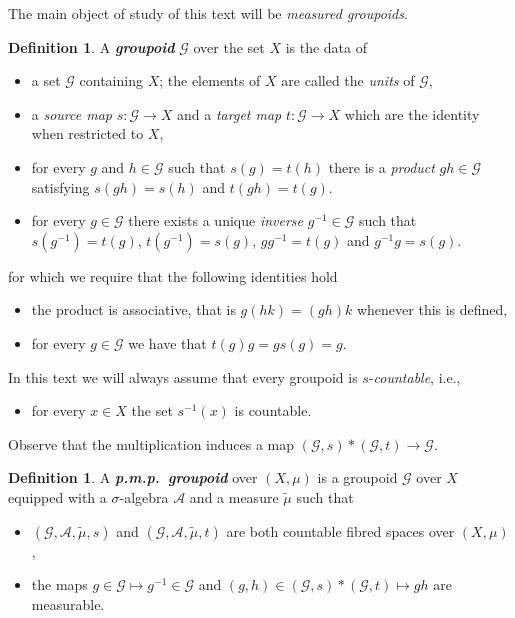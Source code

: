 \documentclass[10pt]{amsart}
\theoremstyle{definition}
\newtheorem{defi}[cdrthm]{Definition}
\newcommand{\defin}[1]{\textbf{\emph{#1}}}
\newcommand{\cg}{\mathcal{G}}
\newcommand{\ra}{\mathscr{A}}
\newcommand{\pmp}{p.m.p.\ }
\begin{document}
The main object of study of this text will be \emph{measured groupoids}.
\begin{defi}
A \defin{groupoid} $\cg$ over the set $X$ is the data of
\begin{itemize}
\item a set $\cg$ containing $X$; the elements of $X$ are called the \emph{units} of $\cg$,
\item a \emph{source map} $s:\cg\rightarrow X$ and a \emph{target map} $t:\cg\rightarrow X$ which are the identity when restricted to $X$,
\item for every $g$ and $h\in\cg$ such that $s(g)=t(h)$ there is a \emph{product} $gh\in\cg$ satisfying $s(gh) = s(h)$ and $t(gh) =t(g)$.
\item for every $g\in\cg$ there exists a unique \emph{inverse} $g^{-1}\in\cg$ such that $s(g^{-1}) = t(g)$, $t(g^{-1})=s(g)$, $g g^{-1} = t(g)$ and $g^{-1}g=s(g)$.
\end{itemize}
for which we require that the following identities hold
\begin{itemize}
\item the product is associative, that is $g(hk)=(gh)k$ whenever this is defined,
\item for every $g\in \cg$ we have that $t(g)g=g s(g) = g$.
\end{itemize}
\end{defi}

In this text we will always assume that every groupoid is $s$-\emph{countable}, i.e.,
\begin{itemize}
\item for every $x\in X$ the set $s^{-1}(x)$ is countable.
\end{itemize}
Observe that the multiplication induces a map $(\cg,s)*(\cg,t)\rightarrow \cg$.

\begin{defi}\label{def: pmp groupoid}
A
\defin{\pmp groupoid} over $(X,\mu)$ is a groupoid $\cg$ over $X$ equipped with a $\sigma$-algebra $\ra$ and a measure $\widetilde \mu$ such that
\begin{itemize}
\item $(\cg,\ra,\widetilde \mu,s)$ and $(\cg,\ra,\widetilde \mu,t)$ are both countable fibred spaces over $(X,\mu)$,
\item the maps $g \in \cg \mapsto g^{-1} \in \cg$ and $(g,h) \in (\cg,s) \ast (\cg,t) \mapsto gh$ are measurable.
\end{itemize}
\end{defi}
\end{document}
